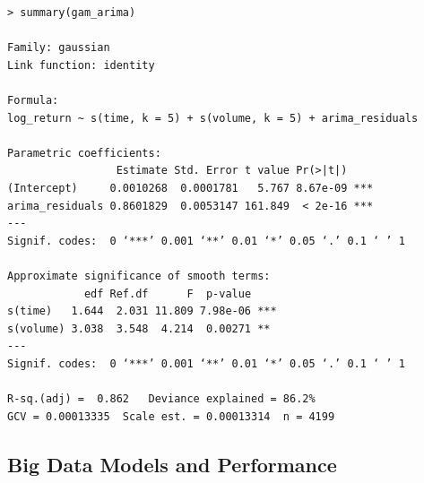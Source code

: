 \begin{verbatim}
> summary(gam_arima)

Family: gaussian 
Link function: identity 

Formula:
log_return ~ s(time, k = 5) + s(volume, k = 5) + arima_residuals

Parametric coefficients:
                 Estimate Std. Error t value Pr(>|t|)    
(Intercept)     0.0010268  0.0001781   5.767 8.67e-09 ***
arima_residuals 0.8601829  0.0053147 161.849  < 2e-16 ***
---
Signif. codes:  0 ‘***’ 0.001 ‘**’ 0.01 ‘*’ 0.05 ‘.’ 0.1 ‘ ’ 1

Approximate significance of smooth terms:
            edf Ref.df      F  p-value    
s(time)   1.644  2.031 11.809 7.98e-06 ***
s(volume) 3.038  3.548  4.214  0.00271 ** 
---
Signif. codes:  0 ‘***’ 0.001 ‘**’ 0.01 ‘*’ 0.05 ‘.’ 0.1 ‘ ’ 1

R-sq.(adj) =  0.862   Deviance explained = 86.2%
GCV = 0.00013335  Scale est. = 0.00013314  n = 4199
\end{verbatim}
\subsection{Big Data Models and Performance}




